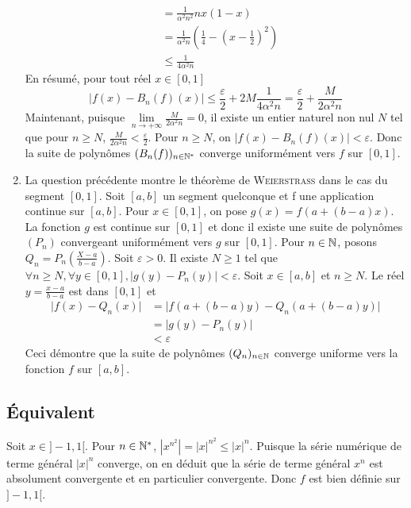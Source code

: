\begin{enumerate}
\[\begin{aligned}
                &= \frac{1}{\alpha^2n^2} nx(1-x)\\
                &= \frac{1}{\alpha^2n}\left(\frac{1}{4}-\left( x- \frac{1}{2} \right)^2 \right)\\
                &\leqslant \frac{1}{4\alpha^2n}
            \end{aligned}
        \]
        En résumé, pour tout réel $x\in[0,1]$
        \[
            \lvert f(x) - B_n(f)(x) \rvert \leqslant \frac{\varepsilon}{2} + 2M \frac{1}{4\alpha^2n} = \frac{\varepsilon}{2} + \frac{M}{2\alpha^2n}
        \]
        Maintenant, puisque $\lim\limits_{n\to +\infty} \frac{M}{2\alpha^2 n} =0$, il existe un entier naturel non nul $N$ tel que pour $n\geqslant N$, $\frac{M}{2\alpha^2n}< \frac{\varepsilon}{2}$. Pour $n\geqslant N$, on $\lvert f(x) - B_n(f)(x) \rvert < \varepsilon$. Donc la suite de polynômes $(B_n(f))_{n\in\mathbb{N}^*}$ converge uniformément vers $f$ sur $[0,1]$.
        \item La question précédente montre le théorème de \textsc{Weierstrass} dans le cas du segment $[0,1]$. Soit $[a,b]$ un segment quelconque et f une application continue sur $[a,b]$. Pour $x\in[0,1]$, on pose $g(x) = f(a+(b-a)x)$. La fonction $g$ est continue sur $[0,1]$ et donc il existe une suite de polynômes $(P_n)$ convergeant uniformément vers $g$ sur $[0,1]$. Pour $n\in\mathbb{N}$, posons $Q_n = P_n\left(\frac{X-a}{b-a}\right)$. Soit $\varepsilon >0$. Il existe $N\geqslant 1$ tel que $\forall n \geqslant N,  \forall y \in [0,1], \lvert g(y)-P_n(y)\rvert < \varepsilon$. Soit $x\in[a,b]$ et $n\geqslant N$. Le réel $y = \frac{x-a}{b-a}$ est dans $[0,1]$ et 
        \[
            \begin{aligned}
                \lvert f(x) - Q_n(x) \rvert &= \lvert f(a+(b-a)y) - Q_n(a+(b-a)y) \rvert\\
                &= \lvert g(y) - P_n(y) \rvert\\
                &<\varepsilon
            \end{aligned}                
        \]
        Ceci démontre que la suite de polynômes $(Q_n)_{n\in\mathbb{N}}$ converge uniforme vers la fonction $f$ sur $[a,b]$.
\end{enumerate}

\subsection{Équivalent}

Soit $x\in ]-1,1[$. Pour $n\in\mathbb{N}^*$, $\left\lvert x^{n^2}\right\rvert = \lvert x \rvert ^{n^2} \leqslant \lvert x \rvert ^n$. Puisque la série numérique de terme général $\lvert x \rvert ^n$ converge, on en déduit que la série de terme général $x^n$ est absolument convergente et en particulier convergente. Donc $f$ est bien définie sur $]-1,1[$.

